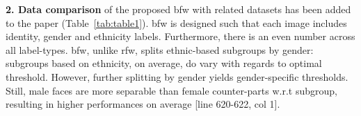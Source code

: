 \documentclass[10pt,twocolumn,letterpaper]{article}
\newcommand{\xmark}{\ding{56}}%
\newcommand{\checkc}{\ding{51}}%
\newcommand{\ie}{\textit{i}.\textit{e}., }
\begin{document}


\noindent\textbf{2. Data comparison} of the proposed \gls{bfw} with related datasets has been added to the paper (Table~\ref{tab:table1}). \gls{bfw} is designed such that each image includes identity, gender and ethnicity labels. Furthermore, there is an even number across all label-types. \gls{bfw}, unlike \gls{rfw}, splits ethnic-based subgroups by gender: subgroups based on ethnicity, on average, do vary with regards to optimal threshold. However, further splitting by gender yields gender-specific thresholds. Still, male faces are more separable than female counter-parts w.r.t subgroup, resulting in higher performances on average [line 620-622, col 1].
\end{document}
